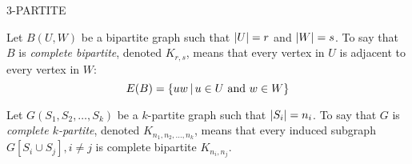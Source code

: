 \documentclass[letterpaper,12pt,fleqn]{article}
\begin{document}
\begin{examples}
\begin{minipage}{3.5in}
\begin{center}
      \bigskip

      \(3\)-PARTITE
    \end{center}
  \end{minipage}
\end{examples}

\begin{definition}
  Let \(B(U,W)\) be a bipartite graph such that \(\lvert U\rvert=r\) and \(\lvert W\rvert=s\).  To say that \(B\) is
  \emph{complete bipartite}, denoted \(K_{r,s}\), means that every vertex in \(U\) is adjacent to every vertex in
  \(W\):
  \[E(B)=\left\{{uw}\,\middle|\,{u\in U\ \text{and}\ w\in W}\right\}\]
\end{definition}

\begin{definition}
  Let \(G(S_1,S_2,\ldots,S_k)\) be a \(k\)-partite graph such that \(\lvert S_i\rvert=n_i\).  To say that \(G\) is
  \emph{complete \(k\)-partite}, denoted \(K_{n_1,n_2,\ldots,n_k}\), means that every induced subgraph
  \(G[S_i\cup S_j],i\ne j\) is complete bipartite \(K_{n_i,n_j}\).
\end{definition}
\end{document}
